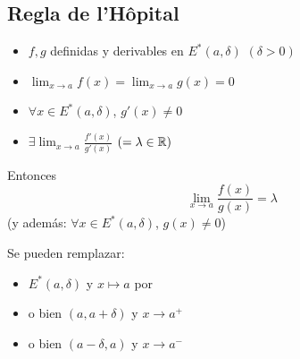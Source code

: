 \documentclass[11pt,a4paper]{article}
\begin{document}
\subsection{Regla de l'Hôpital}

\begin{teorema}\leavevmode
  \begin{itemize}
    \item $f,g$ definidas y derivables en $E^*(a,\delta)$ \quad $(\delta>0)$
    \item $\displaystyle\lim_{x\to a}f(x)=\lim_{x\to a}g(x)=0$
    \item $\forall x\in E^*(a,\delta)$, $g'(x)\neq 0$
    \item $\displaystyle\exists\lim_{x\to a}\frac{f'(x)}{g'(x)}$ \quad $(=\lambda\in\mathbb{R})$
  \end{itemize}
  Entonces
  \[
    \lim_{x\to a}\frac{f(x)}{g(x)}=\lambda
  \]
  (y además: $\forall x\in E^*(a,\delta)$, $g(x)\neq 0$)
\end{teorema}

Se pueden remplazar:
\begin{itemize}
  \item[--] $E^*(a,\delta)$ y $x\mapsto a$ por
  \item[] o bien $(a,a+\delta)$ y $x\to a^+$
  \item[] o bien $(a-\delta,a)$ y $x\to a^-$
\end{itemize}
\end{document}
